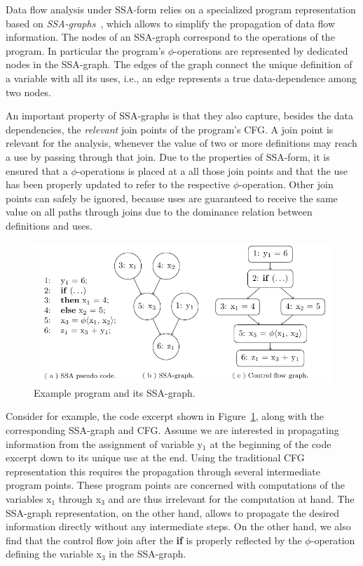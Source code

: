 Data flow analysis under SSA-form relies on a specialized program
representation based on \emph{SSA-graphs}~\cite{novillo:bib:CFRWZ91}, which
allows to simplify the propagation of data flow information. The nodes of an
SSA-graph correspond to the operations of the program. In particular the
program's $\phi$-operations are represented by dedicated nodes in the SSA-graph.
The edges of the graph connect the unique definition of a variable with all its
uses, i.e., an edge represents a true data-dependence among two nodes.

An important property of SSA-graphs is that they also capture, besides the data
dependencies, the \emph{relevant} join points of the program's CFG. A join point
is relevant for the analysis, whenever the value of two or more definitions may
reach a use by passing through that join. Due to the properties of SSA-form, it
is ensured that a $\phi$-operations is placed at a all those join points and
that the use has been properly updated to refer to the respective
$\phi$-operation. Other join points can safely be ignored, because uses are
guaranteed to receive the same value on all paths through joins due to the
dominance relation between definitions and uses.

\begin{figure}[t]
  \begin{center}
    \includegraphics{ssa_graph}
  \end{center}
  \vspace{-2em}
  \caption{Example program and its SSA-graph.}
  \label{novillo:fig:ssa_graph}
\end{figure}

Consider for example, the code excerpt shown in
Figure~\ref{novillo:fig:ssa_graph}, along with the corresponding SSA-graph and
CFG. Assume we are interested in propagating information from the assignment of
variable y$_1$ at the beginning of the code excerpt down to its unique use at
the end. Using the traditional CFG representation this requires the propagation
through several intermediate program points. These program points are concerned
with computations of the variables x$_1$  through x$_3$ and are thus irrelevant
for the computation at hand. The SSA-graph representation, on the other hand,
allows to propagate the desired information directly without any intermediate
steps. On the other hand, we also find that the control flow join after the
\textbf{if} is properly reflected by the $\phi$-operation defining the variable
x$_3$ in the SSA-graph.

